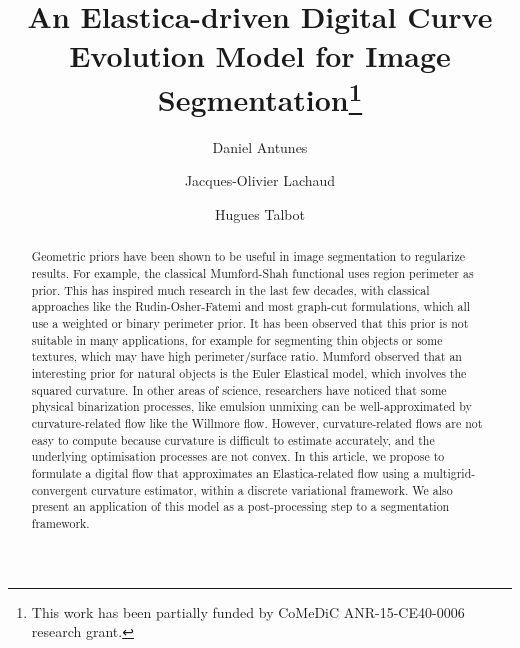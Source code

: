 \documentclass[smallextended]{svjour3}       %
\begin{document}
%
\title{An Elastica-driven Digital Curve Evolution Model for Image Segmentation\thanks{This  work has  been  partially  funded by CoMeDiC ANR-15-CE40-0006 research grant.}}

\author{Daniel Antunes%
\and Jacques-Olivier Lachaud%
\and Hugues Talbot%
}
%
%
%
\maketitle              %
%
\begin{abstract}
  Geometric priors have been shown to be useful in image segmentation to regularize results. For example, the classical
    Mumford-Shah functional uses region perimeter as prior. This has inspired much research in the last few decades,
    with classical approaches like the Rudin-Osher-Fatemi and most graph-cut formulations, which all use a weighted or
    binary perimeter prior. It has been observed that this prior is not suitable in many applications, for example for
    segmenting thin objects or some textures, which may have high perimeter/surface ratio. Mumford observed that an
    interesting prior for natural objects is the Euler Elastical model, which involves the squared curvature. In other
    areas of science, researchers have noticed that some physical binarization processes, like emulsion unmixing can be
    well-approximated by curvature-related flow like the Willmore flow. 
    However, curvature-related flows are not easy to compute because curvature is difficult to estimate accurately, and the
    underlying optimisation processes are not convex. In this article, we propose to formulate a digital flow that
    approximates an Elastica-related flow using a multigrid-convergent curvature estimator, within a discrete
    variational framework. We also present an application of this model as a post-processing step to a segmentation
    framework.
\end{abstract}
%
%
%
\setcounter{footnote}{0}
\end{document}
